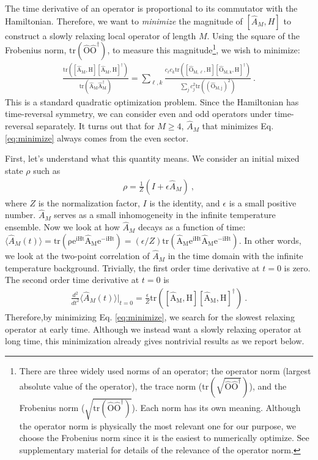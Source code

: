 \documentclass[twocolumn,superscriptaddress, prb]{revtex4-1}
\begin{document}
The time derivative of an operator is proportional to its commutator with the Hamiltonian.
Therefore, we want to {\it minimize} the magnitude of $[\hat{A}_M, H]$
to construct a slowly relaxing local operator of length $M$.
Using the square of the Frobenius norm, $\mathrm{tr(\hat{O}\hat{O}^\dag)}$, to measure this magnitude\footnote{There are three widely used norms of an operator;
the operator norm (largest absolute value of the operator), the trace norm ($\mathrm{tr(\sqrt{\hat{O}\hat{O}^\dag})}$),
and the Frobenius norm ($\sqrt{\mathrm{tr(\hat{O}\hat{O}^\dag)}}$). Each norm has its own meaning.
Although the operator norm is physically the most relevant one for our purpose,
we choose the Frobenius norm since it is the easiest to numerically optimize.
See supplementary material for details of the relevance of the operator norm.},
we wish to minimize:
\begin{align}\label{eq:minimize}
\frac{\mathrm{tr([\hat{A}_M,H][\hat{A}_M,H]^\dag)}}{\mathrm{tr(\hat{A}_M\hat{A}^\dag_M)}} = \sum_{\ell,k}\frac{c_\ell c_k \mathrm{tr([\hat{O}_{M,\ell},H][\hat{O}_{M,k},H]^\dag)}}{\sum_j c_j ^2 \mathrm{tr((\hat{O}_{M,j})^2)}} ~.
\end{align}
This is a standard quadratic optimization problem.
Since the Hamiltonian has time-reversal symmetry,
we can consider even and odd operators under time-reversal separately.
It turns out that for $M\geq 4$, $\hat{A}_M$ that minimizes Eq. \eqref{eq:minimize} always comes from the even sector.

First, let's understand what this quantity means.
We consider an initial mixed state $\rho$ such as
\begin{align}\label{eq:initial}
\rho = \frac{1}{Z}\left(I + \epsilon \hat{A}_M\right) ~,
\end{align}
where $Z$ is the normalization factor, $I$ is the identity, and $\epsilon$ is a small positive number.
$\hat{A}_M$ serves as a small inhomogeneity in the infinite temperature ensemble.
Now we look at how $\hat{A}_M$ decays as a function of time:
$\langle \hat{A}_M(t) \rangle = \mathrm{tr(\rho e^{iHt} \hat{A}_M e^{-iHt})} = (\epsilon/Z)\mathrm{tr(\hat{A}_M e^{iHt} \hat{A}_M e^{-iHt})}$.
In other words, we look at the two-point correlation of $\hat{A}_M$ in the time domain with the infinite temperature background.
Trivially, the first order time derivative at $t = 0$ is zero. The second order time derivative at $t = 0$ is
\begin{align}
\frac{d^2}{dt^2}\langle \hat{A}_M(t)\rangle\bigg|_{t=0} = \frac{\epsilon}{Z}\mathrm{tr([\hat{A}_M,H][\hat{A}_M,H]^\dag)} ~.
\end{align}
Therefore,by minimizing Eq. \eqref{eq:minimize},
we search for the slowest relaxing operator at early time.
Although we instead want a slowly relaxing operator at long time,
this minimization already gives nontrivial results as we report below.
\end{document}
